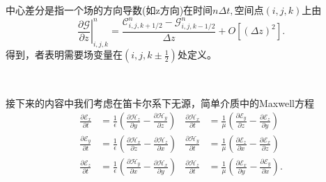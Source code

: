 \documentclass{article}
\begin{document}
\begin{CJK*}{UTF8}{gbsn}
中心差分是指一个场的方向导数(如z方向)在时间$n \Delta
t,$空间点$(i, j, k)$上由
\[ \left. \frac{\partial \mathscr{G}}{\partial z} \right|_{i, j, k}^n =
   \frac{\mathscr{C}_{i, j, k + 1 / 2}^n - \mathscr{G}_{i, j, k - 1 /
   2}^n}{\Delta z} + O [(\Delta z)^2] . \]
得到，者表明需要场变量在$\left( i, j, k \pm \frac{1}{2}
\right)$处定义。


\

接下来的内容中我们考虑在笛卡尔系下无源，简单介质中的Maxwell方程
\[ \begin{aligned}
     \frac{\partial \mathscr{E}_x}{\partial t} & = \frac{1}{\epsilon}  \left(
     \frac{\partial \mathscr{H}_z}{\partial y} - \frac{\partial
     \mathscr{H}_y}{\partial z} \right) & \frac{\partial
     \mathscr{H}_x}{\partial t} & = \frac{1}{\mu}  \left( \frac{\partial
     \mathscr{E}_y}{\partial z} - \frac{\partial \mathscr{E}_z}{\partial y}
     \right)\\
     \frac{\partial \mathscr{E}_y}{\partial t} & = \frac{1}{\epsilon}  \left(
     \frac{\partial \mathscr{H}_x}{\partial z} - \frac{\partial
     \mathscr{H}_z}{\partial x} \right) & \frac{\partial
     \mathscr{H}_y}{\partial t} & = \frac{1}{\mu}  \left( \frac{\partial
     \mathscr{E}_z}{\partial x} - \frac{\partial \mathscr{E}_x}{\partial z}
     \right)\\
     \frac{\partial \mathscr{E}_z}{\partial t} & = \frac{1}{\epsilon}  \left(
     \frac{\partial \mathscr{H}_y}{\partial x} - \frac{\partial
     \mathscr{H}_x}{\partial y} \right) & \frac{\partial
     \mathscr{H}_z}{\partial t} & = \frac{1}{\mu}  \left( \frac{\partial
     \mathscr{E}_x}{\partial y} - \frac{\partial \mathscr{E}_y}{\partial x}
     \right) .
   \end{aligned} \]


\end{CJK*}
\end{document}
